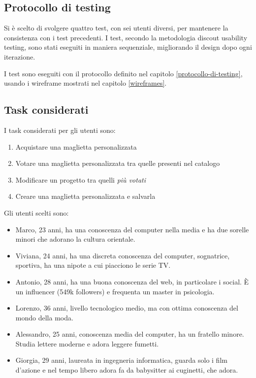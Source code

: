 \documentclass[12pt,italian,]{report}
\providecommand{\tightlist}{%
  \setlength{\itemsep}{0pt}\setlength{\parskip}{0pt}}
\begin{document}
\hypertarget{protocollo-di-testing-1}{%
\subsection{Protocollo di testing}\label{protocollo-di-testing-1}}

Si è scelto di svolgere quattro test, con sei utenti diversi, per
mantenere la consistenza con i test precedenti. I test, secondo la
metodologia discout usability testing, sono stati eseguiti in maniera
sequenziale, migliorando il design dopo ogni iterazione.

I test sono eseguiti con il protocollo definito nel capitolo \ref{protocollo-di-testing}, usando i wireframe mostrati nel capitolo \ref{wireframes}.

\hypertarget{task-considerati}{%
\subsection{Task considerati}\label{task-considerati}}

I task considerati per gli utenti sono:

\begin{enumerate}
\def\labelenumi{\arabic{enumi}.}
\tightlist
\item
  Acquistare una maglietta personalizzata
\item
  Votare una maglietta personalizzata tra quelle presenti nel catalogo
\item
  Modificare un progetto tra quelli \emph{più votati}
\item
  Creare una maglietta personalizzata e salvarla
\end{enumerate}

Gli utenti scelti sono:

\begin{itemize}
\tightlist
\item
  Marco, 23 anni, ha una conoscenza del computer nella media e  ha due sorelle minori che adorano la cultura orientale.
\item
  Viviana, 24 anni, ha una discreta conoscenza del computer, sognatrice,
  sportiva, ha una nipote a cui piacciono le serie TV.
\item
  Antonio, 28 anni, ha una buona conoscenza del web, in particolare i
  social. È un influencer (549k followers) e frequenta un master in
  psicologia.
\item
  Lorenzo, 36 anni, livello tecnologico medio, ma con ottima conoscenza
  del mondo della moda.
\item
  Alessandro, 25 anni, conoscenza media del computer, ha un fratello
  minore. Studia lettere moderne e adora leggere fumetti.
\item
  Giorgia, 29 anni, laureata in ingegneria informatica, guarda solo i
  film d'azione e nel tempo libero adora fa da babysitter ai cuginetti,
  che adora.
\end{itemize}
\end{document}
